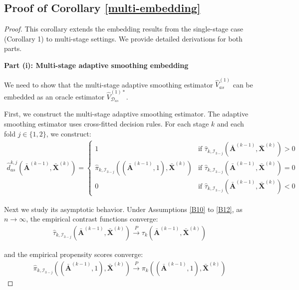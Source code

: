 \documentclass[11pt]{article}
\theoremstyle{referenceplain}
\theoremstyle{referencedefinition}
\theoremstyle{referenceremark}
\begin{document}
\subsection{Proof of Corollary \ref{multi-embedding}}
\begin{proof}
This corollary extends the embedding results from the single-stage case (Corollary 1) to multi-stage settings. We provide detailed derivations for both parts.

\textbf{Part (i): Multi-stage adaptive smoothing embedding}

We need to show that the multi-stage adaptive smoothing estimator $\widehat{V}_{as}^{(1)}$ can be embedded as an oracle estimator $\widehat{V}_{\mathcal{D}_{as}}^{(1)*}$.


First, we construct the multi-stage adaptive smoothing estimator. The adaptive smoothing estimator uses cross-fitted decision rules. For each stage $k$ and each fold $j \in \{1,2\}$, we construct:
\begin{align}
\widehat{d}_{as}^{k,j}(\bar{\mathbf{A}}^{(k-1)}, \bar{\mathbf{X}}^{(k)}) = \begin{cases}
1 & \text{if } \widehat{\tau}_{k,\mathcal{I}_{3-j}}(\bar{\mathbf{A}}^{(k-1)}, \bar{\mathbf{X}}^{(k)}) > 0 \\
\widehat{\pi}_{k,\mathcal{I}_{3-j}}((\bar{\mathbf{A}}^{(k-1)}, 1), \bar{\mathbf{X}}^{(k)}) & \text{if } \widehat{\tau}_{k,\mathcal{I}_{3-j}}(\bar{\mathbf{A}}^{(k-1)}, \bar{\mathbf{X}}^{(k)}) = 0 \\
0 & \text{if } \widehat{\tau}_{k,\mathcal{I}_{3-j}}(\bar{\mathbf{A}}^{(k-1)}, \bar{\mathbf{X}}^{(k)}) < 0
\end{cases}
\end{align}


Next we study its asymptotic behavior. Under Assumptions \ref{B10} to \ref{B12}, as $n \to \infty$, the empirical contrast functions converge:
\begin{align}
\widehat{\tau}_{k,\mathcal{I}_{3-j}}(\bar{\mathbf{A}}^{(k-1)}, \bar{\mathbf{X}}^{(k)}) \xrightarrow{P} \tau_k(\bar{\mathbf{A}}^{(k-1)}, \bar{\mathbf{X}}^{(k)})
\end{align}

and the empirical propensity scores converge:
\begin{align}
\widehat{\pi}_{k,\mathcal{I}_{3-j}}((\bar{\mathbf{A}}^{(k-1)}, 1), \bar{\mathbf{X}}^{(k)}) \xrightarrow{P} \pi_k((\bar{\mathbf{A}}^{(k-1)}, 1), \bar{\mathbf{X}}^{(k)})
\end{align}


\end{proof}
\end{document}
